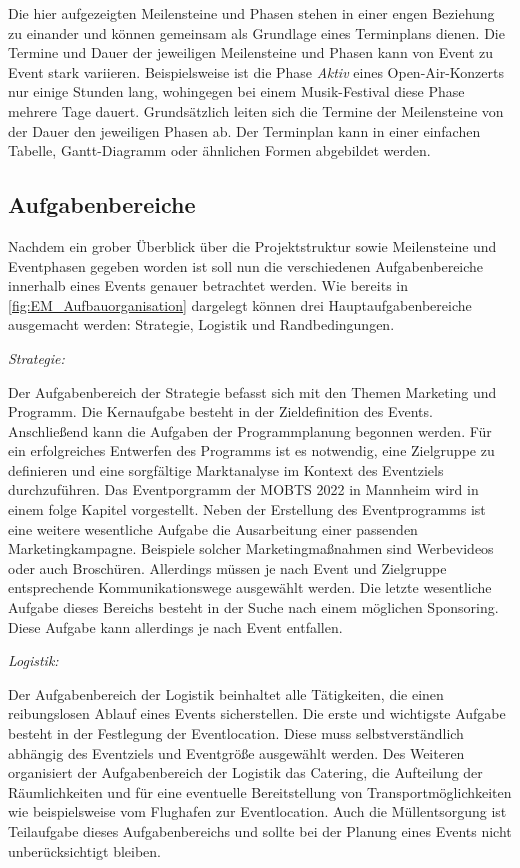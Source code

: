 Die hier aufgezeigten Meilensteine und Phasen stehen in einer engen Beziehung zu einander und können gemeinsam als Grundlage eines Terminplans dienen.
Die Termine und Dauer der jeweiligen Meilensteine und Phasen kann von Event zu Event stark variieren.
Beispielsweise ist die Phase \textit{Aktiv} eines Open-Air-Konzerts nur einige Stunden lang, wohingegen bei einem Musik-Festival diese Phase mehrere Tage dauert.
Grundsätzlich leiten sich die Termine der Meilensteine von der Dauer den jeweiligen Phasen ab.
Der Terminplan kann in einer einfachen Tabelle, Gantt-Diagramm oder ähnlichen Formen abgebildet werden.\autocite[Vgl.][S. 24 ff.]{Holzbaur.2002}

\subsection{Aufgabenbereiche}
Nachdem ein grober Überblick über die Projektstruktur sowie Meilensteine und Eventphasen gegeben worden ist soll nun die verschiedenen Aufgabenbereiche innerhalb eines Events genauer betrachtet werden.
Wie bereits in \autoref{fig:EM_Aufbauorganisation} dargelegt können drei Hauptaufgabenbereiche ausgemacht werden: Strategie, Logistik und Randbedingungen. 

\textit{Strategie:}

Der Aufgabenbereich der Strategie befasst sich mit den Themen Marketing und Programm.
Die Kernaufgabe besteht in der Zieldefinition des Events.
Anschließend kann die Aufgaben der Programmplanung begonnen werden.
Für ein erfolgreiches Entwerfen des Programms ist es notwendig, eine Zielgruppe zu definieren und eine sorgfältige Marktanalyse im Kontext des Eventziels durchzuführen.
Das Eventporgramm der MOBTS 2022 in Mannheim wird in einem folge Kapitel vorgestellt.
Neben der Erstellung des Eventprogramms ist eine weitere wesentliche Aufgabe die Ausarbeitung einer passenden Marketingkampagne.
Beispiele solcher Marketingmaßnahmen sind Werbevideos oder auch Broschüren.
Allerdings müssen je nach Event und Zielgruppe entsprechende Kommunikationswege ausgewählt werden.
Die letzte wesentliche Aufgabe dieses Bereichs besteht in der Suche nach einem möglichen Sponsoring.
Diese Aufgabe kann allerdings je nach Event entfallen.\autocite[Vgl.][S. 168]{Holzbaur.2002}

\textit{Logistik:}

Der Aufgabenbereich der Logistik beinhaltet alle Tätigkeiten, die einen reibungslosen Ablauf eines Events sicherstellen.
Die erste und wichtigste Aufgabe besteht in der Festlegung der Eventlocation.
Diese muss selbstverständlich abhängig des Eventziels und Eventgröße ausgewählt werden.
Des Weiteren organisiert der Aufgabenbereich der Logistik das Catering, die Aufteilung der Räumlichkeiten und für eine eventuelle Bereitstellung von Transportmöglichkeiten wie beispielsweise vom Flughafen zur Eventlocation.
Auch die Müllentsorgung ist Teilaufgabe dieses Aufgabenbereichs und sollte bei der Planung eines Events nicht unberücksichtigt bleiben.\autocite[Vgl.][S. 168 f.]{Holzbaur.2002}

